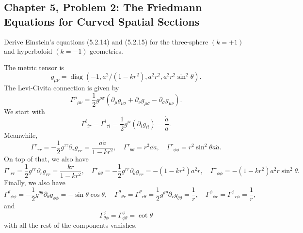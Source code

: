 \subsection{Chapter 5, Problem 2: The Friedmann Equations for Curved Spatial Sections}

Derive Einstein's equations (5.2.14) and (5.2.15) for the three-sphere
$(k=+1)$ and hyperboloid $(k=-1)$ geometries.
\begin{solution}
    The metric tensor is
    \begin{equation}
        g_{\mu\nu} = \operatorname{diag}(-1,a^2/(1-kr^2),a^2r^2,a^2r^2\sin^2\theta).
    \end{equation}
    The Levi-Civita connection is given by
    \begin{equation}
        \Gamma^\rho{}_{\mu\nu} = \frac{1}{2}g^{\rho\sigma}(\partial_\mu g_{\nu\sigma} + \partial_\nu g_{\mu\sigma} - \partial_\sigma g_{\mu\nu}).
    \end{equation}
    We start with
    \begin{equation}
        \Gamma^i{}_{i\tau} = \Gamma^i{}_{\tau i} = \frac{1}{2}g^{ii}(\partial_ig_{ii}) = \frac{\dot a}{a}.
    \end{equation}
    Meanwhile,
    \begin{equation}
        \Gamma^\tau{}_{rr} = -\frac{1}{2}g^{\tau\tau}\partial_\tau g_{rr} = \frac{a\dot a}{1-kr^2},\quad  \Gamma^\tau{}_{\theta\theta} = r^2a\dot a, \quad \Gamma^\tau{}_{\phi\phi} = r^2\sin^2\theta a\dot a.
    \end{equation}
    On top of that, we also have
    \begin{equation}
        \Gamma^r{}_{rr} = \frac{1}{2}g^{rr}\partial_rg_{rr} = \frac{kr}{1-kr^2}, \quad \Gamma^r{}_{\theta\theta} = - \frac{1}{2}g^{rr}\partial_\theta g_{rr} = -(1-kr^2)a^2r, \quad \Gamma^r{}_{\phi\phi} = -(1-kr^2)a^2r\sin^2\theta.
    \end{equation}
    Finally, we also have
    \begin{equation}
        \Gamma^\theta{}_{\phi\phi} = -\frac{1}{2}g^{\theta\theta}\partial_\theta g_{\phi\phi} = -\sin\theta\cos\theta, \quad \Gamma^\theta{}_{\theta r} = \Gamma^\theta{}_{r\theta } = \frac{1}{2}g^{\theta\theta}\partial_rg_{\theta\theta} = \frac{1}{r}, \quad \Gamma^\phi{}_{\phi r} = \Gamma^\phi{}_{r\phi } = \frac{1}{r},
    \end{equation}
    and
    \begin{equation}
        \Gamma^\phi_{\theta\phi}
=
\Gamma^\phi_{\phi\theta}
=
\cot\theta
    \end{equation}
    with all the rest of the components vanishes.


\end{solution}
